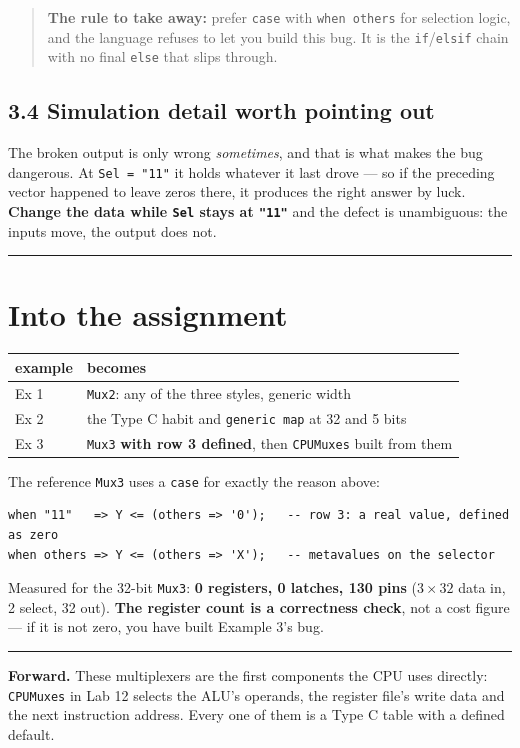 \documentclass[11pt]{article}
\newcommand{\code}[1]{\texttt{#1}}
\newcommand{\hr}{\vspace{2pt}\hrule\vspace{6pt}}
\begin{document}
\begin{quote}
\textbf{The rule to take away:} prefer \code{case} with \code{when others} for
selection logic, and the language refuses to let you build this bug. It is the
\code{if}/\code{elsif} chain with no final \code{else} that slips through.
\end{quote}

\subsection*{3.4 Simulation detail worth pointing out}

The broken output is only wrong \emph{sometimes}, and that is what makes the bug
dangerous. At \code{Sel = "11"} it holds whatever it last drove --- so if the
preceding vector happened to leave zeros there, it produces the right answer by
luck. \textbf{Change the data while \code{Sel} stays at \code{"11"}} and the
defect is unambiguous: the inputs move, the output does not.

\vspace{4pt}\hr

\section*{Into the assignment}

\begin{center}
\begin{tabular}{ll}
\toprule
example & becomes \\
\midrule
Ex 1 & \code{Mux2}: any of the three styles, generic width \\
Ex 2 & the Type C habit and \code{generic map} at 32 and 5 bits \\
Ex 3 & \code{Mux3} \textbf{with row 3 defined}, then \code{CPUMuxes} built from them \\
\bottomrule
\end{tabular}
\end{center}

The reference \code{Mux3} uses a \code{case} for exactly the reason above:

\begin{lstlisting}
when "11"   => Y <= (others => '0');   -- row 3: a real value, defined as zero
when others => Y <= (others => 'X');   -- metavalues on the selector
\end{lstlisting}

Measured for the 32-bit \code{Mux3}: \textbf{0 registers, 0 latches, 130 pins}
($3 \times 32$ data in, 2 select, 32 out). \textbf{The register count is a
correctness check}, not a cost figure --- if it is not zero, you have built
Example 3's bug.

\vspace{6pt}
\hr
{\small \textbf{Forward.} These multiplexers are the first components the CPU
uses directly: \code{CPUMuxes} in Lab 12 selects the ALU's operands, the register
file's write data and the next instruction address. Every one of them is a Type C
table with a defined default.}
\end{document}
